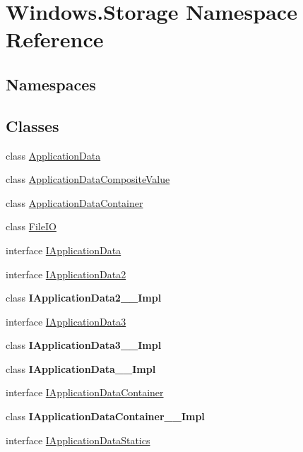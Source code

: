 \hypertarget{namespace_windows_1_1_storage}{}\section{Windows.\+Storage Namespace Reference}
\label{namespace_windows_1_1_storage}
\subsection*{Namespaces}
\begin{DoxyCompactItemize}
\end{DoxyCompactItemize}
\subsection*{Classes}
\begin{DoxyCompactItemize}
\item 
class \hyperlink{class_windows_1_1_storage_1_1_application_data}{Application\+Data}
\item 
class \hyperlink{class_windows_1_1_storage_1_1_application_data_composite_value}{Application\+Data\+Composite\+Value}
\item 
class \hyperlink{class_windows_1_1_storage_1_1_application_data_container}{Application\+Data\+Container}
\item 
class \hyperlink{class_windows_1_1_storage_1_1_file_i_o}{File\+IO}
\item 
interface \hyperlink{interface_windows_1_1_storage_1_1_i_application_data}{I\+Application\+Data}
\item 
interface \hyperlink{interface_windows_1_1_storage_1_1_i_application_data2}{I\+Application\+Data2}
\item 
class {\bfseries I\+Application\+Data2\+\_\+\+\_\+\+Impl}
\item 
interface \hyperlink{interface_windows_1_1_storage_1_1_i_application_data3}{I\+Application\+Data3}
\item 
class {\bfseries I\+Application\+Data3\+\_\+\+\_\+\+Impl}
\item 
class {\bfseries I\+Application\+Data\+\_\+\+\_\+\+Impl}
\item 
interface \hyperlink{interface_windows_1_1_storage_1_1_i_application_data_container}{I\+Application\+Data\+Container}
\item 
class {\bfseries I\+Application\+Data\+Container\+\_\+\+\_\+\+Impl}
\item 
interface \hyperlink{interface_windows_1_1_storage_1_1_i_application_data_statics}{I\+Application\+Data\+Statics}

\end{DoxyCompactItemize}
